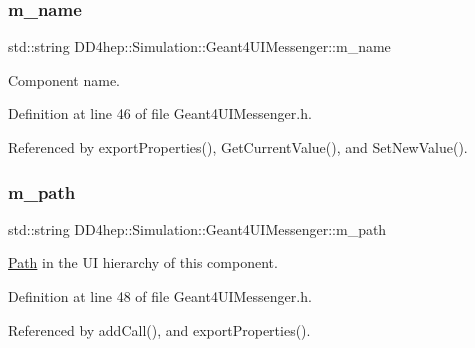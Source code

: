 \subsubsection{\texorpdfstring{m\+\_\+name}{m\_name}}
{\footnotesize\ttfamily std\+::string D\+D4hep\+::\+Simulation\+::\+Geant4\+U\+I\+Messenger\+::m\+\_\+name\hspace{0.3cm}{\ttfamily [protected]}}



Component name. 



Definition at line 46 of file Geant4\+U\+I\+Messenger.\+h.



Referenced by export\+Properties(), Get\+Current\+Value(), and Set\+New\+Value().

\hypertarget{class_d_d4hep_1_1_simulation_1_1_geant4_u_i_messenger_a8b314ffb2df2f6268eb13abdad35c1dc}{}\label{class_d_d4hep_1_1_simulation_1_1_geant4_u_i_messenger_a8b314ffb2df2f6268eb13abdad35c1dc} 
\subsubsection{\texorpdfstring{m\+\_\+path}{m\_path}}
{\footnotesize\ttfamily std\+::string D\+D4hep\+::\+Simulation\+::\+Geant4\+U\+I\+Messenger\+::m\+\_\+path\hspace{0.3cm}{\ttfamily [protected]}}



\hyperlink{class_d_d4hep_1_1_path}{Path} in the UI hierarchy of this component. 



Definition at line 48 of file Geant4\+U\+I\+Messenger.\+h.



Referenced by add\+Call(), and export\+Properties().

\hypertarget{class_d_d4hep_1_1_simulation_1_1_geant4_u_i_messenger_a6be8711d442a1d0031c83f9a5300f1eb}{}\label{class_d_d4hep_1_1_simulation_1_1_geant4_u_i_messenger_a6be8711d442a1d0031c83f9a5300f1eb} 
